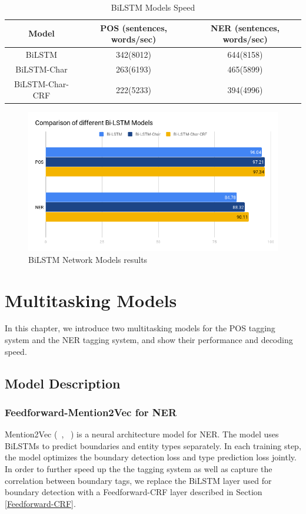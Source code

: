\documentclass{sfuthesis}
\begin{document}
\begin{table}[]
\centering
\caption{BiLSTM Models Speed}
\label{table:lstm-table2}
\begin{tabular}{|c|c|c|}
\hline
Model       & POS  (sentences, words/sec)  & NER  (sentences, words/sec)      \\ \hline
BiLSTM             & 342(8012)     & 644(8158)       \\ \hline
BiLSTM-Char        & 263(6193)  & 465(5899)             \\ \hline
BiLSTM-Char-CRF    & 222(5233)  & 394(4996)         \\ \hline
\end{tabular}
\end{table}

\begin{figure}
  \centering
  \includegraphics[scale=0.6]{lstm.png}
 \caption{BiLSTM Network Models results}
  \label{fig:lstm}
\end{figure}


\chapter{Multitasking Models}
In this chapter, we introduce two multitasking models for the POS tagging system and the NER tagging system, and show their performance and decoding speed. 
\section{Model Description}
\subsection{Feedforward-Mention2Vec for NER}
Mention2Vec (~\citeauthor{stratos2016mention2vec}, ~\citeyear{stratos2016mention2vec}) is a neural architecture model for NER. The model uses BiLSTMs to predict boundaries and entity types separately. In each training step, the model optimizes the boundary detection loss and type prediction loss jointly.  In order to further speed up the the tagging system as well as capture the correlation between boundary tags, we replace the BiLSTM layer used for boundary detection with a Feedforward-CRF layer described in Section \ref{Feedforward-CRF}.
\end{document}
